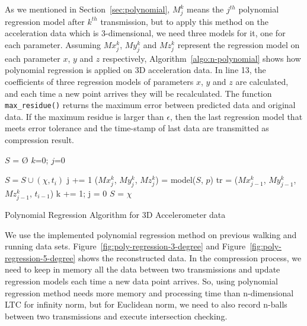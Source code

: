 As we mentioned in Section~\ref{sec:polynomial}, $M_{j}^{k}$ means the $j^{th}$
polynomial regression model after $k^{th}$ transmission, but to apply this
method on the acceleration data which is 3-dimensional, we need three models for
it, one for each parameter. Assuming $Mx_{j}^{k}$, $My_{j}^{k}$ and $Mz_{j}^{k}$
represent the regression model on each parameter $x$, $y$ and $z$ respectively,
Algorithm~\ref{algo:n-polynomial} shows how polynomial regression is applied on
3D acceleration data. In line 13, the coefficients of three regression models of
parameters $x$, $y$ and $z$ are calculated, and each time a new point arrives
they will be recalculated. The function \texttt{max\_residue()} returns the
maximum error between predicted data and original data. If the maximum residue
is larger than $\epsilon$, then the last regression model that meets error
tolerance and the time-stamp of last data are transmitted as compression result.
\begin{algorithm}
\begin{algorithmic}[1]
\Input
\EndInput
\Output
\EndOutput
\State $S$ = $\text{\O}$
\State $k$=0; $j$=0

    \State $S = S \cup (\chi, t_i)$
        \State j += 1
        \State ($Mx_{j}^{k}$, $My_{j}^{k}$, $Mz_{j}^{k}$) = model($S$, $p$)    
            \State tr = ($Mx_{j-1}^{k}$, $My_{j-1}^{k}$, $Mz_{j-1}^{k}$, $t_{i-1}$)
            \State k += 1; j = 0
            \State $S$ = $\chi$
        \EndIf
    \EndIf
\EndWhile

\end{algorithmic}
\caption{Polynomial Regression Algorithm for 3D Accelerometer data}
\label{algo:n-polynomial}
\end{algorithm}

We use the implemented polynomial regression method on previous walking and
running data sets. Figure~\ref{fig:poly-regression-3-degree} and
Figure~\ref{fig:poly-regression-5-degree} shows the reconstructed data. In the
compression process, we need to keep in memory all the data between two
transmissions and update regression models each time a new data point arrives.
So, using polynomial regression method needs more memory and processing time
than n-dimensional LTC for infinity norm, but for Euclidean norm, we need to
also record n-balls between two transmissions and execute intersection checking. 

